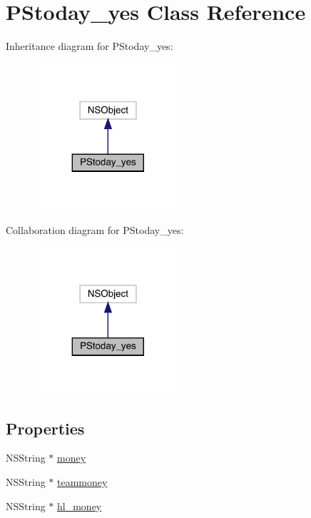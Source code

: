\hypertarget{interface_p_stoday__yes}{}\section{P\+Stoday\+\_\+yes Class Reference}
\label{interface_p_stoday__yes}


Inheritance diagram for P\+Stoday\+\_\+yes\+:\nopagebreak
\begin{figure}[H]
\begin{center}
\leavevmode
\includegraphics[width=155pt]{interface_p_stoday__yes__inherit__graph}
\end{center}
\end{figure}


Collaboration diagram for P\+Stoday\+\_\+yes\+:\nopagebreak
\begin{figure}[H]
\begin{center}
\leavevmode
\includegraphics[width=155pt]{interface_p_stoday__yes__coll__graph}
\end{center}
\end{figure}
\subsection*{Properties}
\begin{DoxyCompactItemize}
\item 
N\+S\+String $\ast$ \mbox{\hyperlink{interface_p_stoday__yes_a7e710deb44c57c1fa2c6d9e762d42726}{money}}
\item 
N\+S\+String $\ast$ \mbox{\hyperlink{interface_p_stoday__yes_a6b586a4ab8c9b299aadd74ada9f3921d}{teammoney}}
\item 
N\+S\+String $\ast$ \mbox{\hyperlink{interface_p_stoday__yes_afd6af8b889b76c162d6ba72ea47d7a8e}{hl\+\_\+money}}
\end{DoxyCompactItemize}


